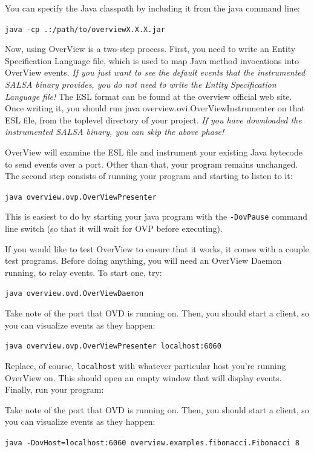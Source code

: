 You can specify the Java classpath by including it from the java command line:
\begin{description}
  \item {\tt java -cp .:/path/to/overviewX.X.X.jar}
\end{description}

Now, using OverView is a two-step process. First, you need to write an Entity Specification Language file, 
which is used to map Java method invocations into OverView events. 
\emph{If you just want to see the default events that the instrumented SALSA binary provides, 
you do not need to write the Entity Specification Language file!}
The ESL format can be found at the overview official web site. 
Once writing it, you should run 
java overview.ovi.OverViewInstrumenter on that ESL file, from the toplevel directory of your project.
\emph{If you have downloaded the instrumented SALSA binary, you can skip the above phase!}
 
OverView will examine the ESL file and instrument your existing Java bytecode to send events over a port. 
Other than that, your program remains unchanged. The second step consists of running your program and 
starting to listen to it:
\begin{description}
  \item {\tt  java overview.ovp.OverViewPresenter}
\end{description} 
 
This is easiest to do by starting your 
java program with the {\tt -DovPause} command line switch (so that it will wait for OVP before executing).

If you would like to test OverView to ensure that it works, it comes with a couple test programs. 
Before doing anything, you will need an OverView Daemon running, to relay events. To start one, try:
\begin{description}
  \item {\tt  java overview.ovd.OverViewDaemon}
\end{description} 

Take note of the port that OVD is running on. Then, you should start a client, so you can visualize events as they happen:
\begin{description}
  \item {\tt  java overview.ovp.OverViewPresenter localhost:6060}
\end{description} 

Replace, of course, {\tt localhost} with whatever particular host you're running OverView on. 
This should open an empty window that will display events. Finally, run your program:
{\sloppy
Take note of the port that OVD is running on. Then, you should start a client, so you can visualize events as they happen:
\begin{description}
  \item {\tt  java -DovHost=localhost:6060 overview.examples.fibonacci.Fibonacci 8 }
\end{description} 
}

